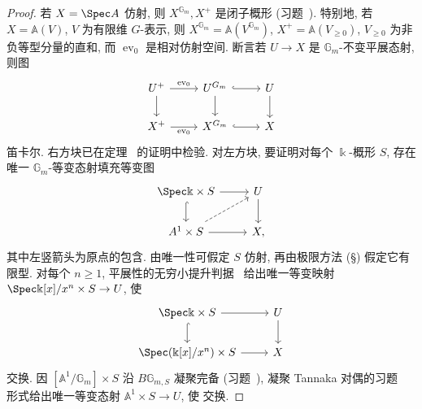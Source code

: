 \begin{proof}
若 $X=\Spec A$ 仿射, 则 $X^{\mathbb G_m},X^+$ 是闭子概形 (习题~). 特别地, 若 $X=\mathbb A(V)$, $V$ 为有限维 $G$-表示, 则 $X^{\mathbb G_m}=\mathbb A(V^{\mathbb G_m})$, $X^+=\mathbb A(V_{\ge0})$, $V_{\ge0}$ 为非负等型分量的直和, 而 $\operatorname{ev}_0$ 是相对仿射空间. 断言若 $U\to X$ 是 $\mathbb G_m$-不变平展态射, 则图
\begin{align}\label{src:7.8.10}
\begin{tikzcd}[ampersand replacement=\&]
U^+\arrow[r,"{\operatorname{ev}_0}"]\arrow[d]\&U^{\mathbb G_m}\arrow[r,hook]\arrow[d]\&U\arrow[d]\\
X^+\arrow[r,"{\operatorname{ev}_0}"']\&X^{\mathbb G_m}\arrow[r,hook]\&X
\end{tikzcd}
\end{align}
笛卡尔. 右方块已在定理~ 的证明中检验. 对左方块, 要证明对每个 $\Bbbk$-概形 $S$, 存在唯一 $\mathbb G_m$-等变态射填充等变图
\begin{align}\label{src:7.8.11}
\begin{tikzcd}[ampersand replacement=\&]
\Spec\Bbbk\times S\arrow[r]\arrow[d,hook]\&U\arrow[d]\\
\mathbb A^1\times S\arrow[r]\arrow[ur,dashed]\&X,
\end{tikzcd}
\end{align}
其中左竖箭头为原点的包含. 由唯一性可假定 $S$ 仿射, 再由极限方法 (\S{}) 假定它有限型. 对每个 $n\ge1$, 平展性的无穷小提升判据~ 给出唯一等变映射 $\Spec\Bbbk[x]/x^n\times S\to U$, 使
\begin{align*}
\begin{tikzcd}[ampersand replacement=\&]
\Spec\Bbbk\times S\arrow[r]\arrow[d,hook]\&U\arrow[d]\\
\Spec(\Bbbk[x]/x^n)\times S\arrow[r]\&X
\end{tikzcd}
\end{align*}
交换. 因 $[\mathbb A^1/\mathbb G_m]\times S$ 沿 $B\mathbb G_{m,S}$ 凝聚完备 (习题~), 凝聚 Tannaka 对偶的习题~ 形式给出唯一等变态射 $\mathbb A^1\times S\to U$, 使  交换.


\end{proof}
